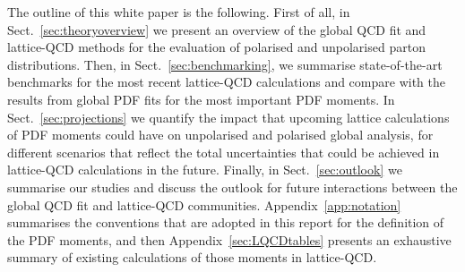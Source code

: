 The outline of this white paper is the following.
%
First of all, in Sect.~\ref{sec:theoryoverview} we present an overview of
the global QCD fit and lattice-QCD methods for the evaluation
of polarised and unpolarised parton distributions.
%
Then, in Sect.~\ref{sec:benchmarking},
we summarise state-of-the-art benchmarks for the most
recent lattice-QCD calculations and compare with the results from global PDF fits
for the most important PDF moments.
%
In Sect.~\ref{sec:projections} we quantify the impact that
upcoming lattice calculations of PDF moments could have on unpolarised
and polarised global analysis, for different scenarios
that reflect the total uncertainties that could be achieved in lattice-QCD 
calculations in the future.
%
Finally, in Sect.~\ref{sec:outlook} we summarise our studies
and discuss the outlook for future interactions between
the global QCD fit and lattice-QCD communities.
%
Appendix~\ref{app:notation} summarises the conventions
that are adopted in this report for the definition of the PDF
moments, and then
Appendix~\ref{sec:LQCDtables} presents an exhaustive summary of existing calculations
of those moments in lattice-QCD.
